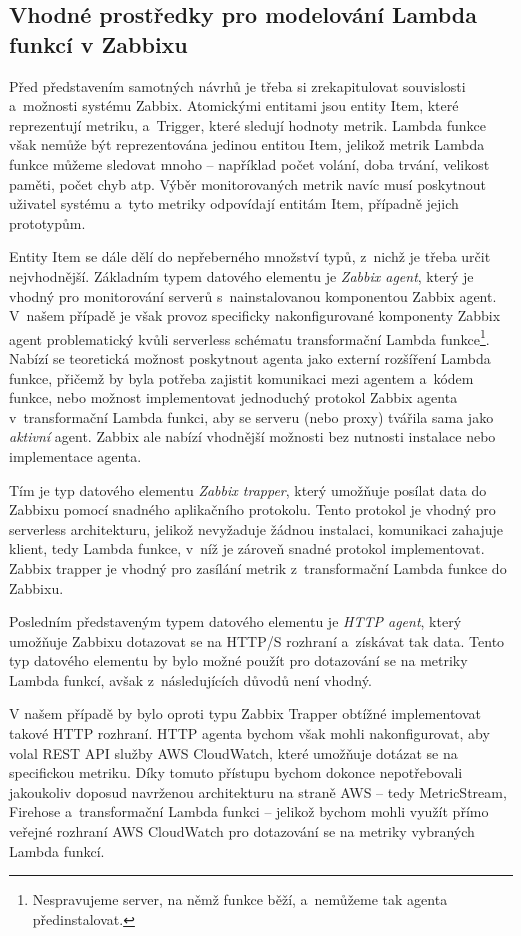 \documentclass[czech, ing, kiv, he, iso690]{fasthesis}
\begin{document}
\subsection{Vhodné prostředky pro modelování Lambda funkcí v Zabbixu}
Před představením samotných návrhů je třeba si zrekapitulovat souvislosti a~možnosti systému Zabbix. Atomickými entitami jsou entity Item, které reprezentují metriku, a~Trigger, které sledují hodnoty metrik. Lambda funkce však nemůže být reprezentována jedinou entitou Item, jelikož metrik Lambda funkce můžeme sledovat mnoho -- například počet volání, doba trvání, velikost paměti, počet chyb atp. Výběr monitorovaných metrik navíc musí poskytnout uživatel systému a~tyto metriky odpovídají entitám Item, případně jejich prototypům.

Entity Item se dále dělí do nepřeberného množství typů, z~nichž je třeba určit nejvhodnější. Základním typem datového elementu je \emph{Zabbix agent}, který je vhodný pro monitorování serverů s~nainstalovanou komponentou Zabbix agent. V~našem případě je však provoz specificky nakonfigurované komponenty Zabbix agent problematický kvůli serverless schématu transformační Lambda funkce\footnote{Nespravujeme server, na němž funkce běží, a~nemůžeme tak agenta předinstalovat.}. Nabízí se teoretická možnost poskytnout agenta jako externí rozšíření Lambda funkce, přičemž by byla potřeba zajistit komunikaci mezi agentem a~kódem funkce, nebo možnost implementovat jednoduchý protokol Zabbix agenta v~transformační Lambda funkci, aby se serveru (nebo proxy) tvářila sama jako \emph{aktivní} agent. Zabbix ale nabízí vhodnější možnosti bez nutnosti instalace nebo implementace agenta.

Tím je typ datového elementu \emph{Zabbix trapper}, který umožňuje posílat data do Zabbixu pomocí snadného aplikačního protokolu. Tento protokol je vhodný pro serverless architekturu, jelikož nevyžaduje žádnou instalaci, komunikaci zahajuje klient, tedy Lambda funkce, v~níž je zároveň snadné protokol implementovat. Zabbix trapper je vhodný pro zasílání metrik z~transformační Lambda funkce do Zabbixu.

Posledním představeným typem datového elementu je \emph{HTTP agent}, který umožňuje Zabbixu dotazovat se na HTTP/S rozhraní a~získávat tak data. Tento typ datového elementu by bylo možné použít pro dotazování se na metriky Lambda funkcí, avšak z~následujících důvodů není vhodný.

V našem případě by bylo oproti typu Zabbix Trapper obtížné implementovat takové HTTP rozhraní. HTTP agenta bychom však mohli nakonfigurovat, aby volal REST API služby AWS CloudWatch, které umožňuje dotázat se na specifickou metriku. Díky tomuto přístupu bychom dokonce nepotřebovali jakoukoliv doposud navrženou architekturu na straně AWS -- tedy MetricStream, Firehose a~transformační Lambda funkci -- jelikož bychom mohli využít přímo veřejné rozhraní AWS CloudWatch pro dotazování se na metriky vybraných Lambda funkcí.
\end{document}
